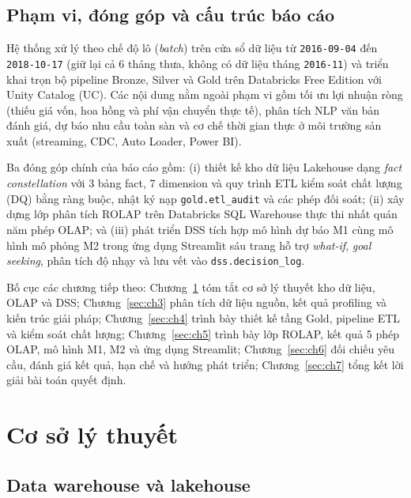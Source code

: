 \documentclass[a4paper]{article}
\begin{document}
\subsection{Phạm vi, đóng góp và cấu trúc báo cáo}
\label{subsec:1_4}

Hệ thống xử lý theo chế độ lô (\textit{batch}) trên cửa sổ dữ liệu từ \texttt{2016-09-04} đến \texttt{2018-10-17} (giữ lại cả 6 tháng thưa, không có dữ liệu tháng \texttt{2016-11}) và triển khai trọn bộ pipeline Bronze, Silver và Gold trên Databricks Free Edition với Unity Catalog (UC). Các nội dung nằm ngoài phạm vi gồm tối ưu lợi nhuận ròng (thiếu giá vốn, hoa hồng và phí vận chuyển thực tế), phân tích NLP văn bản đánh giá, dự báo nhu cầu toàn sàn và cơ chế thời gian thực ở môi trường sản xuất (streaming, CDC, Auto Loader, Power BI).

Ba đóng góp chính của báo cáo gồm: (i) thiết kế kho dữ liệu Lakehouse dạng \textit{fact constellation} với 3 bảng fact, 7 dimension và quy trình ETL kiểm soát chất lượng (DQ) bằng ràng buộc, nhật ký nạp \texttt{gold.etl\_audit} và các phép đối soát; (ii) xây dựng lớp phân tích ROLAP trên Databricks SQL Warehouse thực thi nhất quán năm phép OLAP; và (iii) phát triển DSS tích hợp mô hình dự báo M1 cùng mô hình mô phỏng M2 trong ứng dụng Streamlit sáu trang hỗ trợ \textit{what-if}, \textit{goal seeking}, phân tích độ nhạy và lưu vết vào \texttt{dss.decision\_log}.

Bố cục các chương tiếp theo: Chương~\ref{sec:ch2} tóm tắt cơ sở lý thuyết kho dữ liệu, OLAP và DSS; Chương~\ref{sec:ch3} phân tích dữ liệu nguồn, kết quả profiling và kiến trúc giải pháp; Chương~\ref{sec:ch4} trình bày thiết kế tầng Gold, pipeline ETL và kiểm soát chất lượng; Chương~\ref{sec:ch5} trình bày lớp ROLAP, kết quả 5 phép OLAP, mô hình M1, M2 và ứng dụng Streamlit; Chương~\ref{sec:ch6} đối chiếu yêu cầu, đánh giá kết quả, hạn chế và hướng phát triển; Chương~\ref{sec:ch7} tổng kết lời giải bài toán quyết định.

\section{Cơ sở lý thuyết}
\label{sec:ch2}

\subsection{Data warehouse và lakehouse}
\label{subsec:2_1}
\end{document}

